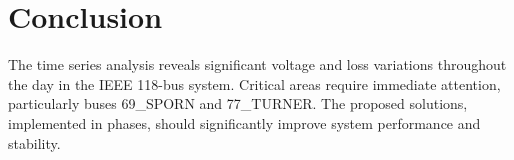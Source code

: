 \documentclass[11pt]{article}
\begin{document}
\section{Conclusion}
The time series analysis reveals significant voltage and loss variations throughout the day in the IEEE 118-bus system. Critical areas require immediate attention, particularly buses 69\_SPORN and 77\_TURNER. The proposed solutions, implemented in phases, should significantly improve system performance and stability.
\end{document}
